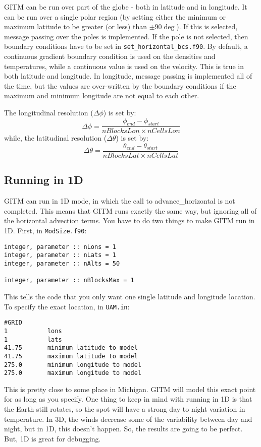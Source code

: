 GITM can be run over part of the globe - both in latitude and in
longitude.  It can be run over a single polar region (by setting
either the minimum or maximum latitude to be greater (or less) than
$\pm 90\deg$).  If this is selected, message passing over the poles is
implemented.  If the pole is not selected, then boundary conditions
have to be set in {\tt set\_horizontal\_bcs.f90}.  By default, a
continuous gradient boundary condition is used on the densities and
temperatures, while a continuous value is used on the velocity.  This
is true in both latitude and longitude.  In longitude, message passing
is implemented all of the time, but the values are over-written by the
boundary conditions if the maximum and minimum longitude are not equal
to each other.

The longitudinal resolution ($\Delta{\phi}$) is set by:
\begin{equation}
\Delta{\phi} = \frac{\phi_{end} - \phi_{start}}{nBlocksLon \times nCellsLon}
\end{equation}
while, the latitudinal resolution ($\Delta{\theta}$) is set by:
\begin{equation}
\Delta{\theta} = \frac{\theta_{end} - \theta_{start}}{nBlocksLat \times nCellsLat}
\end{equation}

\subsection{Running in 1D}

GITM can run in 1D mode, in which the call to advance\_horizontal is
not completed.  This means that GITM runs exactly the same way, but
ignoring all of the horizontal advection terms.  You have to do two
things to make GITM run in 1D.  First, in {\tt ModSize.f90}:
\begin{verbatim}
integer, parameter :: nLons = 1
integer, parameter :: nLats = 1
integer, parameter :: nAlts = 50

integer, parameter :: nBlocksMax = 1
\end{verbatim}
This tells the code that you only want one single latitude and
longitude location.  To specify the exact location, in {\tt UAM.in}:
\begin{verbatim}
#GRID
1           lons
1           lats
41.75       minimum latitude to model
41.75       maximum latitude to model
275.0       minimum longitude to model
275.0       maximum longitude to model
\end{verbatim}
This is pretty close to some place in Michigan.  GITM will model this
exact point for as long as you specify.  One thing to keep in mind
with running in 1D is that the Earth still rotates, so the spot will
have a strong day to night variation in temperature.  In 3D, the winds
decrease some of the variability between day and night, but in 1D,
this doesn't happen.  So, the results are going to be perfect.  But,
1D is great for debugging.

